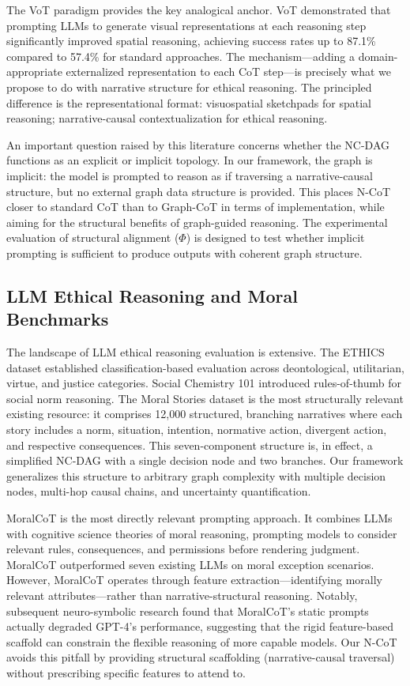 \documentclass[11pt,letterpaper]{article}
\theoremstyle{defn}
\begin{document}
The VoT paradigm \citep{wu2024mindseye} provides the key analogical anchor. VoT demonstrated that prompting LLMs to generate visual representations at each reasoning step significantly improved spatial reasoning, achieving success rates up to 87.1\% compared to 57.4\% for standard approaches. The mechanism---adding a domain-appropriate externalized representation to each CoT step---is precisely what we propose to do with narrative structure for ethical reasoning. The principled difference is the representational format: visuospatial sketchpads for spatial reasoning; narrative-causal contextualization for ethical reasoning.

An important question raised by this literature concerns whether the NC-DAG functions as an explicit or implicit topology. In our framework, the graph is implicit: the model is prompted to reason as if traversing a narrative-causal structure, but no external graph data structure is provided. This places N-CoT closer to standard CoT than to Graph-CoT in terms of implementation, while aiming for the structural benefits of graph-guided reasoning. The experimental evaluation of structural alignment ($\Phi$) is designed to test whether implicit prompting is sufficient to produce outputs with coherent graph structure.

\subsection{LLM Ethical Reasoning and Moral Benchmarks}

The landscape of LLM ethical reasoning evaluation is extensive. The ETHICS dataset \citep{hendrycks2020} established classification-based evaluation across deontological, utilitarian, virtue, and justice categories. Social Chemistry 101 \citep{forbes2020} introduced rules-of-thumb for social norm reasoning. The Moral Stories dataset \citep{emelin2021moral} is the most structurally relevant existing resource: it comprises 12{,}000 structured, branching narratives where each story includes a norm, situation, intention, normative action, divergent action, and respective consequences. This seven-component structure is, in effect, a simplified NC-DAG with a single decision node and two branches. Our framework generalizes this structure to arbitrary graph complexity with multiple decision nodes, multi-hop causal chains, and uncertainty quantification.

MoralCoT \citep{jin2022when} is the most directly relevant prompting approach. It combines LLMs with cognitive science theories of moral reasoning, prompting models to consider relevant rules, consequences, and permissions before rendering judgment. MoralCoT outperformed seven existing LLMs on moral exception scenarios. However, MoralCoT operates through feature extraction---identifying morally relevant attributes---rather than narrative-structural reasoning. Notably, subsequent neuro-symbolic research found that MoralCoT's static prompts actually degraded GPT-4's performance, suggesting that the rigid feature-based scaffold can constrain the flexible reasoning of more capable models. Our N-CoT avoids this pitfall by providing structural scaffolding (narrative-causal traversal) without prescribing specific features to attend to.
\end{document}
